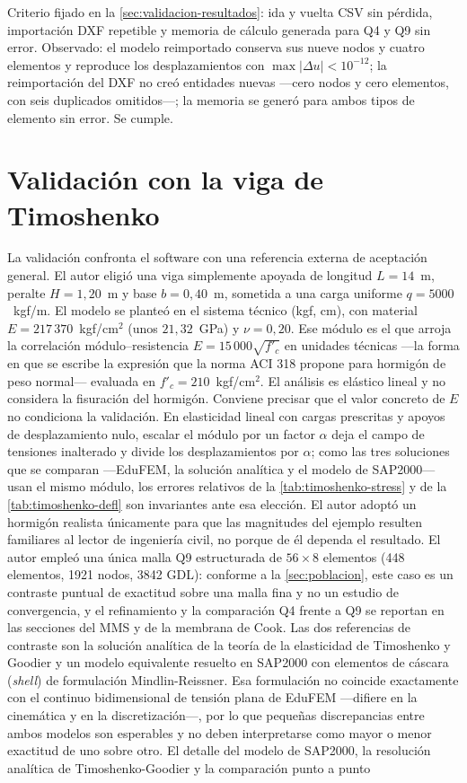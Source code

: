 Criterio fijado en la \autoref{sec:validacion-resultados}: ida y vuelta CSV sin pérdida, importación DXF repetible y memoria de cálculo generada para Q4 y Q9 sin error. Observado: el modelo reimportado conserva sus nueve nodos y cuatro elementos y reproduce los desplazamientos con $\max|\Delta u| < 10^{-12}$; la reimportación del DXF no creó entidades nuevas —cero nodos y cero elementos, con seis duplicados omitidos—; la memoria se generó para ambos tipos de elemento sin error. Se cumple.

\section{Validación con la viga de Timoshenko}
\label{sec:timoshenko}

La validación confronta el software con una referencia externa de aceptación general. El autor eligió una viga simplemente apoyada de longitud $L = 14$~m, peralte $H = 1{,}20$~m y base $b = 0{,}40$~m, sometida a una carga uniforme $q = 5000$~kgf/m. El modelo se planteó en el sistema técnico (kgf, cm), con material $E = 217\,370$~kgf/cm$^2$ (unos $21{,}32$~GPa) y $\nu = 0{,}20$. Ese módulo es el que arroja la correlación módulo--resistencia $E = 15\,000\sqrt{f'_c}$ en unidades técnicas ---la forma en que se escribe la expresión que la norma ACI 318 propone para hormigón de peso normal--- evaluada en $f'_c = 210$~kgf/cm$^2$. El análisis es elástico lineal y no considera la fisuración del hormigón. Conviene precisar que el valor concreto de $E$ no condiciona la validación. En elasticidad lineal con cargas prescritas y apoyos de desplazamiento nulo, escalar el módulo por un factor $\alpha$ deja el campo de tensiones inalterado y divide los desplazamientos por $\alpha$; como las tres soluciones que se comparan ---EduFEM, la solución analítica y el modelo de SAP2000--- usan el mismo módulo, los errores relativos de la \autoref{tab:timoshenko-stress} y de la \autoref{tab:timoshenko-defl} son invariantes ante esa elección. El autor adoptó un hormigón realista únicamente para que las magnitudes del ejemplo resulten familiares al lector de ingeniería civil, no porque de él dependa el resultado. El autor empleó una única malla Q9 estructurada de $56\times8$ elementos (448 elementos, 1921 nodos, 3842 GDL): conforme a la \autoref{sec:poblacion}, este caso es un contraste puntual de exactitud sobre una malla fina y no un estudio de convergencia, y el refinamiento y la comparación Q4 frente a Q9 se reportan en las secciones del MMS y de la membrana de Cook. Las dos referencias de contraste son la solución analítica de la teoría de la elasticidad de Timoshenko y Goodier \autocite[art.~21, pp.~39-43]{timoshenko1970elasticity} y un modelo equivalente resuelto en SAP2000 \autocite[p.~179]{csi2017sap2000} con elementos de cáscara (\emph{shell}) de formulación Mindlin-Reissner. Esa formulación no coincide exactamente con el continuo bidimensional de tensión plana de EduFEM —difiere en la cinemática y en la discretización—, por lo que pequeñas discrepancias entre ambos modelos son esperables y no deben interpretarse como mayor o menor exactitud de uno sobre otro. El detalle del modelo de SAP2000, la resolución analítica de Timoshenko-Goodier y la comparación punto a punto 